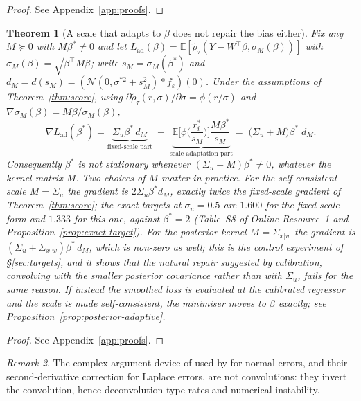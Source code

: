 \documentclass[12pt,a4paper]{article}
\newtheorem{theorem}{Theorem}[section]
\theoremstyle{definition}
\theoremstyle{remark}
\newtheorem{remark}[theorem]{Remark}
\newcommand{\E}{\mathbb{E}}
\newcommand{\cN}{\mathcal{N}}
\newcommand{\rht}{\tilde{\rho}_\tau}
\newcommand{\betas}{\beta^*}
\newcommand{\bbar}{\bar{\beta}}
\newcommand{\Sxw}{\Sigma_{x|w}}
\begin{document}
\begin{proof}
See Appendix~\ref{app:proofs}.
\end{proof}

\begin{theorem}[A scale that adapts to $\beta$ does not repair the bias either]
\label{thm:adaptive}
Fix any $M\succeq0$ with $M\betas\neq0$ and let
$L_{\mathrm{ad}}(\beta) = \E[\rht(Y-W^\top\beta,\sigma_M(\beta))]$ with
$\sigma_M(\beta)=\sqrt{\beta^\top M\beta}$; write $s_M=\sigma_M(\betas)$ and
$d_M = d(s_M) = (\cN(0,\sigma^{*2}+s_M^{2})*f_\varepsilon)(0)$. Under the assumptions of
Theorem~\ref{thm:score}, using $\partial\rht(r,\sigma)/\partial\sigma = \phi(r/\sigma)$ and
$\nabla\sigma_M(\beta) = M\beta/\sigma_M(\beta)$,
\begin{equation}
\nabla L_{\mathrm{ad}}(\betas)
= \underbrace{\Sigma_u\betas\,d_M}_{\text{fixed-scale part}}
\;+\;\underbrace{\E\Big[\phi\Big(\frac{r_i^*}{s_M}\Big)\Big]\frac{M\betas}{s_M}}
_{\text{scale-adaptation part}}
= \;\big(\Sigma_u+M\big)\betas\; d_M .
\label{eq:adaptive}
\end{equation}
Consequently $\betas$ is not stationary whenever $(\Sigma_u+M)\betas\neq0$, whatever the
kernel matrix $M$. Two choices of $M$ matter in practice. For the self-consistent scale
$M=\Sigma_u$ the gradient is $2\Sigma_u\betas d_{M}$, exactly \emph{twice} the
fixed-scale gradient of Theorem~\ref{thm:score}; the exact targets at $\sigma_u=0.5$ are
$1.600$ for the fixed-scale form and $1.333$ for this one, against $\betas=2$
(Table~S8 of Online Resource~1 and Proposition~\ref{prop:exact-target}). For the posterior
kernel $M=\Sxw$ the gradient is $(\Sigma_u+\Sxw)\betas\,d_M$, which is non-zero as well;
this is the control experiment of \S\ref{sec:targets}, and it shows that the natural
repair suggested by calibration, convolving with the smaller posterior covariance rather
than with $\Sigma_u$, fails for the same reason. If instead the smoothed loss is
evaluated at the calibrated regressor and the scale is made self-consistent, the
minimiser moves to $\bbar$ exactly; see Proposition~\ref{prop:posterior-adaptive}.
\end{theorem}

\begin{proof}
See Appendix~\ref{app:proofs}.
\end{proof}

\begin{remark}
The complex-argument device of \citet{stefanski1989} used by
\citet{wang2012correctedloss} for normal errors, and their second-derivative correction for
Laplace errors, are not convolutions: they invert the convolution, hence deconvolution-type
rates and numerical instability.
\end{remark}
\end{document}
